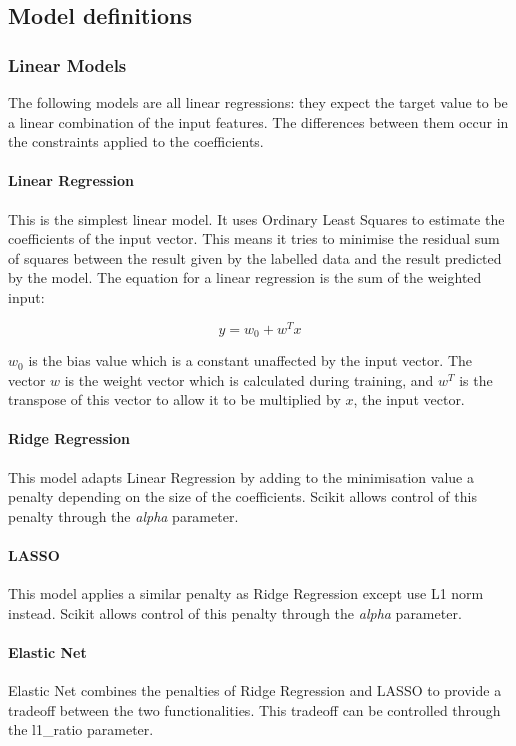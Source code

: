 \subsection{Model definitions}


\subsubsection{Linear Models}
The following models are all linear regressions: they expect the target value to be a linear combination of the input features. The differences between them occur in the constraints applied to the coefficients.

\paragraph*{Linear Regression}
This is the simplest linear model. It uses Ordinary Least Squares to estimate the coefficients of the input vector. This means it tries to minimise the residual sum of squares between the result given by the labelled data and the result predicted by the model. The equation for a linear regression is the sum of the weighted input:

\begin{displaymath}
y = w_{0} + w^{T}x
\end{displaymath}

$w_{0}$ is the bias value which is a constant unaffected by the input vector. The vector $w$ is the weight vector which is calculated during training, and $w^{T}$ is the transpose of this vector to allow it to be multiplied by $x$, the input vector.

\paragraph*{Ridge Regression}
This model adapts Linear Regression by adding to the minimisation value a penalty depending on the size of the coefficients. Scikit allows control of this penalty through the {\it alpha} parameter.

\paragraph*{LASSO}
This model applies a similar penalty as Ridge Regression except use L1 norm instead. Scikit allows control of this penalty through the {\it alpha} parameter.

\paragraph*{Elastic Net}
Elastic Net combines the penalties of Ridge Regression and LASSO to provide a tradeoff between the two functionalities. This tradeoff can be controlled through the l1\_ratio parameter.

